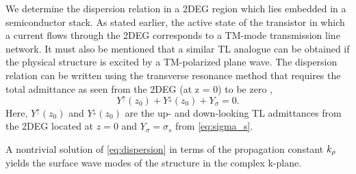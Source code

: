 \documentclass[12pt]{article}
\begin{document}
We determine the dispersion relation in a 2DEG region which lies embedded in a semiconductor stack. As stated earlier, the active state of the transistor in which a current flows through the 2DEG corresponds to a TM-mode transmission line network. It must also be mentioned that a similar TL analogue can be obtained if the physical structure is excited by a TM-polarized plane wave. The dispersion relation can be written using the transverse resonance method that requires the total admittance as seen from the 2DEG (at z = 0) to be zero \cite{Gomez-Diaz2012},
%
\begin{equation}
  Y^{\uparrow}(z_0) + Y^{\downarrow}(z_0) + Y_{\sigma} = 0.
  \label{eq:dispersion}
\end{equation}
%
Here, $Y^{\uparrow}(z_0)$ and $Y^{\downarrow}(z_0)$ are the up- and down-looking TL admittances from the 2DEG located at $z = 0$ and $Y_{\sigma} = \sigma_s$ from \eqref{eq:sigma_s}.

A nontrivial solution of \eqref{eq:dispersion} in terms of the propagation constant $k_{\rho}$ yields the surface wave modes of the structure in the complex k-plane.
\end{document}
